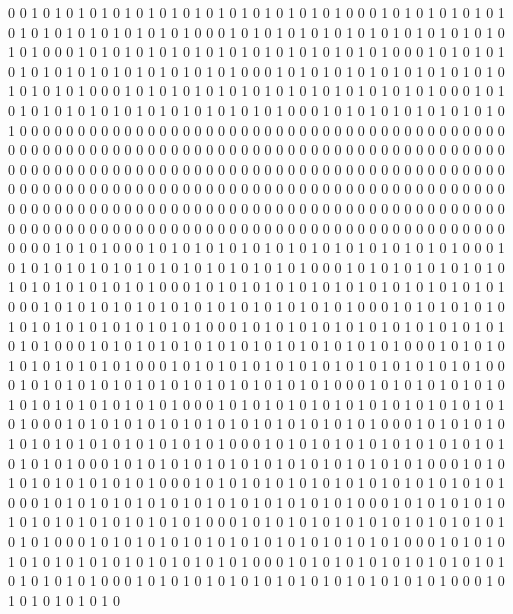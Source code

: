 0 0 1 0 1 0 1 0 1 0 1 0 1 0 1 0 1 0 1 0 1 0 1 0 1 0 1 0 1 0 0 0 1 0 1 0 1 0 1 0 1 0 1 0 1 0 1 0 1 0 1 0 1 0 1 0 1 0 1 0 0 0 1 0 1 0 1 0 1 0 1 0 1 0 1 0 1 0 1 0 1 0 1 0 1 0 1 0 1 0 0 0 1 0 1 0 1 0 1 0 1 0 1 0 1 0 1 0 1 0 1 0 1 0 1 0 1 0 1 0 0 0 1 0 1 0 1 0 1 0 1 0 1 0 1 0 1 0 1 0 1 0 1 0 1 0 1 0 1 0 0 0 1 0 1 0 1 0 1 0 1 0 1 0 1 0 1 0 1 0 1 0 1 0 1 0 1 0 1 0 0 0 1 0 1 0 1 0 1 0 1 0 1 0 1 0 1 0 1 0 1 0 1 0 1 0 1 0 1 0 0 0 1 0 1 0 1 0 1 0 1 0 1 0 1 0 1 0 1 0 1 0 1 0 1 0 1 0 1 0 0 0 1 0 1 0 1 0 1 0 1 0 1 0 1 0 1 0 1 0 
0 0 0 0 0 0 0 0 0 0 0 0 0 0 0 0 0 0 0 0 0 0 0 0 0 0 0 0 0 0 0 0 0 0 0 0 0 0 0 0 0 0 0 0 0 0 0 0 0 0 0 0 0 0 0 0 0 0 0 0 0 0 0 0 0 0 0 0 0 0 0 0 0 0 0 0 0 0 0 0 0 0 0 0 0 0 0 0 0 0 0 0 0 0 0 0 0 0 0 0 0 0 0 0 0 0 0 0 0 0 0 0 0 0 0 0 0 0 0 0 0 0 0 0 0 0 0 0 0 0 0 0 0 0 0 0 0 0 0 0 0 0 0 0 0 0 0 0 0 0 0 0 0 0 0 0 0 0 0 0 0 0 0 0 0 0 0 0 0 0 0 0 0 0 0 0 0 0 0 0 0 0 0 0 0 0 0 0 0 0 0 0 0 0 0 0 0 0 0 0 0 0 0 0 0 0 0 0 0 0 0 0 0 0 0 0 0 0 0 0 0 0 0 0 0 0 0 0 0 0 0 0 0 0 0 0 0 0 0 0 0 0 0 0 0 0 0 0 0 0 0 0 0 0 0 0 0 0 0 0 
1 0 1 0 1 0 0 0 1 0 1 0 1 0 1 0 1 0 1 0 1 0 1 0 1 0 1 0 1 0 1 0 1 0 1 0 0 0 1 0 1 0 1 0 1 0 1 0 1 0 1 0 1 0 1 0 1 0 1 0 1 0 1 0 1 0 0 0 1 0 1 0 1 0 1 0 1 0 1 0 1 0 1 0 1 0 1 0 1 0 1 0 1 0 1 0 0 0 1 0 1 0 1 0 1 0 1 0 1 0 1 0 1 0 1 0 1 0 1 0 1 0 1 0 1 0 0 0 1 0 1 0 1 0 1 0 1 0 1 0 1 0 1 0 1 0 1 0 1 0 1 0 1 0 1 0 0 0 1 0 1 0 1 0 1 0 1 0 1 0 1 0 1 0 1 0 1 0 1 0 1 0 1 0 1 0 0 0 1 0 1 0 1 0 1 0 1 0 1 0 1 0 1 0 1 0 1 0 1 0 1 0 1 0 1 0 0 0 1 0 1 0 1 0 1 0 1 0 1 0 1 0 1 0 1 0 1 0 1 0 1 0 1 0 1 0 0 0 1 0 1 0 1 0 1 0 1 0 1 0 
1 0 1 0 1 0 0 0 1 0 1 0 1 0 1 0 1 0 1 0 1 0 1 0 1 0 1 0 1 0 1 0 1 0 1 0 0 0 1 0 1 0 1 0 1 0 1 0 1 0 1 0 1 0 1 0 1 0 1 0 1 0 1 0 1 0 0 0 1 0 1 0 1 0 1 0 1 0 1 0 1 0 1 0 1 0 1 0 1 0 1 0 1 0 1 0 0 0 1 0 1 0 1 0 1 0 1 0 1 0 1 0 1 0 1 0 1 0 1 0 1 0 1 0 1 0 0 0 1 0 1 0 1 0 1 0 1 0 1 0 1 0 1 0 1 0 1 0 1 0 1 0 1 0 1 0 0 0 1 0 1 0 1 0 1 0 1 0 1 0 1 0 1 0 1 0 1 0 1 0 1 0 1 0 1 0 0 0 1 0 1 0 1 0 1 0 1 0 1 0 1 0 1 0 1 0 1 0 1 0 1 0 1 0 1 0 0 0 1 0 1 0 1 0 1 0 1 0 1 0 1 0 1 0 1 0 1 0 1 0 1 0 1 0 1 0 0 0 1 0 1 0 1 0 1 0 1 0 1 0 
1 0 1 0 1 0 0 0 1 0 1 0 1 0 1 0 1 0 1 0 1 0 1 0 1 0 1 0 1 0 1 0 1 0 1 0 0 0 1 0 1 0 1 0 1 0 1 0 1 0 1 0 1 0 1 0 1 0 1 0 1 0 1 0 1 0 0 0 1 0 1 0 1 0 1 0 1 0 1 0 1 0 1 0 1 0 1 0 1 0 1 0 1 0 1 0 0 0 1 0 1 0 1 0 1 0 1 0 1 0 1 0 1 0 1 0 1 0 1 0 1 0 1 0 1 0 0 0 1 0 1 0 1 0 1 0 1 0 1 0 1 0 1 0 1 0 1 0 1 0 1 0 1 0 1 0 0 0 1 0 1 0 1 0 1 0 1 0 1 0 1 0 1 0 1 0 1 0 1 0 1 0 1 0 1 0 0 0 1 0 1 0 1 0 1 0 1 0 1 0 1 0 1 0 1 0 1 0 1 0 1 0 1 0 1 0 0 0 1 0 1 0 1 0 1 0 1 0 1 0 1 0 1 0 1 0 1 0 1 0 1 0 1 0 1 0 0 0 1 0 1 0 1 0 1 0 1 0 1 0 
